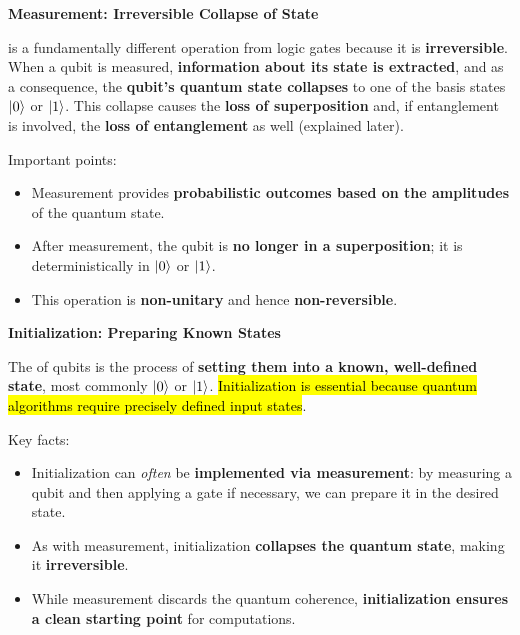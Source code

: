 \highspace
\begin{flushleft}
    \textcolor{Green3}{ \textbf{Measurement: Irreversible Collapse of State}}
\end{flushleft}
 is a fundamentally different operation from logic gates because it is \textbf{irreversible}. When a qubit is measured, \textbf{information about its state is extracted}, and as a consequence, the \textbf{qubit's quantum state collapses} to one of the basis states $| 0 \rangle$ or $| 1 \rangle$. This collapse causes the \textbf{loss of superposition} and, if entanglement is involved, the \textbf{loss of entanglement} as well (explained later).

\highspace
Important points:
\begin{itemize}
    \item Measurement provides \textbf{probabilistic outcomes based on the amplitudes} of the quantum state.
    \item After measurement, the qubit is \textbf{no longer in a superposition}; it is deterministically in $| 0 \rangle$ or $| 1 \rangle$.
    \item This operation is \textbf{non-unitary} and hence \textbf{non-reversible}.
\end{itemize}

\highspace
\begin{flushleft}
    \textcolor{Green3}{ \textbf{Initialization: Preparing Known States}}
\end{flushleft}
The  of qubits is the process of \textbf{setting them into a known, well-defined state}, most commonly $| 0 \rangle$ or $| 1 \rangle$. \hl{Initialization is essential because quantum algorithms require precisely defined input states}.

\highspace
Key facts:
\begin{itemize}
    \item Initialization can \emph{often} be \textbf{implemented via measurement}: by measuring a qubit and then applying a gate if necessary, we can prepare it in the desired state.
    \item As with measurement, initialization \textbf{collapses the quantum state}, making it \textbf{irreversible}.
    \item While measurement discards the quantum coherence, \textbf{initialization ensures a clean starting point} for computations.
\end{itemize}

